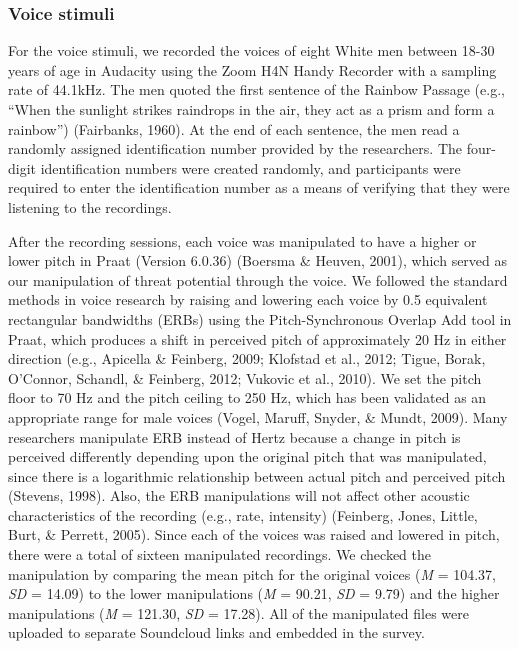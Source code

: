 \documentclass[
  english,
  man, noextraspace,floatsintext]{apa6}
\begin{document}
\hypertarget{voice-stimuli}{%
\subsubsection{Voice stimuli}\label{voice-stimuli}}

For the voice stimuli, we recorded the voices of eight White men between 18-30 years of age in Audacity using the Zoom H4N Handy Recorder with a sampling rate of 44.1kHz. The men quoted the first sentence of the Rainbow Passage (e.g., ``When the sunlight strikes raindrops in the air, they act as a prism and form a rainbow'') (Fairbanks, 1960). At the end of each sentence, the men read a randomly assigned identification number provided by the researchers. The four-digit identification numbers were created randomly, and participants were required to enter the identification number as a means of verifying that they were listening to the recordings.

After the recording sessions, each voice was manipulated to have a higher or lower pitch in Praat (Version 6.0.36) (Boersma \& Heuven, 2001), which served as our manipulation of threat potential through the voice. We followed the standard methods in voice research by raising and lowering each voice by 0.5 equivalent rectangular bandwidths (ERBs) using the Pitch-Synchronous Overlap Add tool in Praat, which produces a shift in perceived pitch of approximately 20 Hz in either direction (e.g., Apicella \& Feinberg, 2009; Klofstad et al., 2012; Tigue, Borak, O'Connor, Schandl, \& Feinberg, 2012; Vukovic et al., 2010). We set the pitch floor to 70 Hz and the pitch ceiling to 250 Hz, which has been validated as an appropriate range for male voices (Vogel, Maruff, Snyder, \& Mundt, 2009). Many researchers manipulate ERB instead of Hertz because a change in pitch is perceived differently depending upon the original pitch that was manipulated, since there is a logarithmic relationship between actual pitch and perceived pitch (Stevens, 1998). Also, the ERB manipulations will not affect other acoustic characteristics of the recording (e.g., rate, intensity) (Feinberg, Jones, Little, Burt, \& Perrett, 2005). Since each of the voices was raised and lowered in pitch, there were a total of sixteen manipulated recordings. We checked the manipulation by comparing the mean pitch for the original voices (\emph{M} = 104.37, \emph{SD} = 14.09) to the lower manipulations (\emph{M} = 90.21, \emph{SD} = 9.79) and the higher manipulations (\emph{M} = 121.30, \emph{SD} = 17.28). All of the manipulated files were uploaded to separate Soundcloud links and embedded in the survey.
\end{document}
